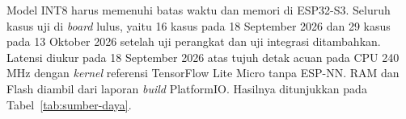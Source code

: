 Model INT8 harus memenuhi batas waktu dan memori di ESP32-S3. Seluruh kasus uji di \textit{board} lulus, yaitu 16 kasus pada 18 September 2026 dan 29 kasus pada 13 Oktober 2026 setelah uji perangkat dan uji integrasi ditambahkan. Latensi diukur pada 18 September 2026 atas tujuh detak acuan pada CPU 240 MHz dengan \textit{kernel} referensi TensorFlow Lite Micro tanpa ESP-NN. RAM dan Flash diambil dari laporan \textit{build} PlatformIO. Hasilnya ditunjukkan pada Tabel~\ref{tab:sumber-daya}.


